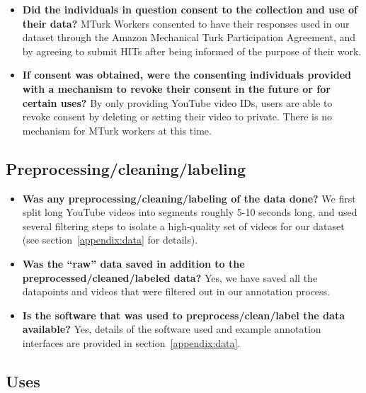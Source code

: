 \documentclass[runningheads]{llncs}
\begin{document}
\begin{itemize}
\item \textbf{Did the individuals in question consent to the collection and use
of their data?} MTurk Workers consented to have their responses used in our dataset through the Amazon Mechanical Turk Participation Agreement, and by agreeing to submit HITs after being informed of the purpose of their work. 

\item \textbf{If consent was obtained, were the consenting individuals provided
with a mechanism to revoke their consent in the future or for certain
uses?}  By only providing YouTube video IDs, users are able to revoke consent by deleting or setting their video to private. There is no mechanism for MTurk workers at this time.

\end{itemize}

\subsection{Preprocessing/cleaning/labeling}

\begin{itemize}
    \item \textbf{Was any preprocessing/cleaning/labeling of the data done?} We first split long YouTube videos into segments roughly 5-10 seconds long, and used several filtering steps to isolate a high-quality set of videos for our dataset (see section~\ref{appendix:data} for details). 
    
    \item \textbf{Was the “raw” data saved in addition to the preprocessed/cleaned/labeled data?} Yes, we have saved all the datapoints and videos that were filtered out in our annotation process. 
    
    \item \textbf{Is the software that was used to preprocess/clean/label the data available?} Yes, details of the software used and example annotation interfaces are provided in section~\ref{appendix:data}. 
\end{itemize}

\subsection{Uses}
\end{document}
